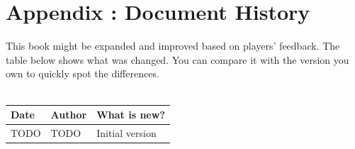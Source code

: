 \onecolumn
\chapter{Appendix \thechapter{}: Document History}

This book might be expanded and improved based on players' feedback. The table below shows what was changed. You can compare it with the version you own to quickly spot the differences. \\ \\

\begin{tabular}{p{2cm} p{2cm} p{10cm}}
	Date & Author & What is new? \\ \hline	
	
	\color{black} TODO
	& \color{black} TODO
	& \color{black}   Initial version \\	
	\hline	
	
\end{tabular}

\twocolumn

